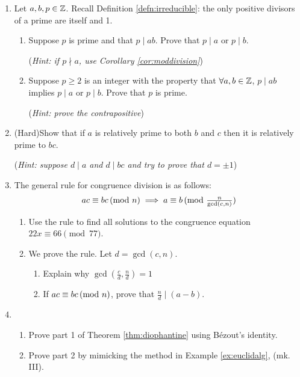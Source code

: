 \begin{exercises}{}{}
\begin{enumerate}
	  
		\item Let $a,b,p\in\mathbb{Z}$. Recall Definition \ref{defn:irreducible}: the only positive divisors of a prime are itself and 1.
	  \begin{enumerate}
	    \item Suppose $p$ is prime and that $p\mid ab$. Prove that $p\mid a$ or $p\mid b$.\par
	    (\emph{Hint: if $p\nmid a$, use Corollary \ref{cor:moddivision}})
	    \item Suppose $p\ge 2$ is an integer with the property that $\forall a,b\in\mathbb{Z}$, $p\mid ab$ implies $p\mid a$ or $p\mid b$. Prove that $p$ is prime.\par
	    (\emph{Hint: prove the contrapositive})
	  \end{enumerate}
	    
	    
	    \item (Hard)\lstsp Show that if $a$ is relatively prime to both $b$ and $c$ then it is relatively prime to $bc$.\par
	    (\emph{Hint: suppose $d\mid a$ and $d\mid bc$ and try to prove that $d=\pm 1$})
	    
	    
			\item\label{exs:congdivision} The general rule for congruence division is as follows:
			\[
				ac\equiv bc\negthickspace\pmod{n} \implies a\equiv b\negthickspace\pmod{\tfrac n{\gcd(c,n)}}
			\]
			\begin{enumerate}
			  \item Use the rule to find all solutions to the congruence equation $22x\equiv 66\pmod{77}$.
			  \item We prove the rule. Let $d=\gcd(c,n)$.
			  \begin{enumerate}
			    \item Explain why $\gcd(\frac cd,\frac nd)=1$
			  	\item If $ac\equiv bc\negthickspace\pmod{n}$, prove that $\frac nd\mid(a-b)$.
				\end{enumerate}
			\end{enumerate}
			
	    
	  \item\begin{enumerate}
	    \item Prove part 1 of Theorem \ref{thm:diophantine} using Bézout's identity.
	    \item Prove part 2 by mimicking the method in Example \ref{ex:euclidalg}, (mk.\,III).
	  \end{enumerate} 
	    

\end{enumerate}
\end{exercises}
